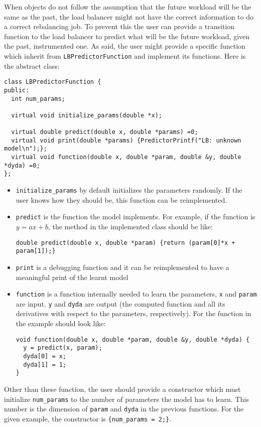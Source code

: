 When objects do not follow the assumption that the future workload will be the
same as the past, the load balancer might not have the correct information to do
a correct rebalancing job. To prevent this the user can provide a transition
function to the load balancer to predict what will be the future workload, given
the past, instrumented one. As said, the user might provide a specific function
which inherit from {\tt LBPredictorFunction} and implement its
functions. Here is the abstract class:
\begin{verbatim}
class LBPredictorFunction {
public:
  int num_params;
 
  virtual void initialize_params(double *x);

  virtual double predict(double x, double *params) =0;
  virtual void print(double *params) {PredictorPrintf("LB: unknown model\n");};
  virtual void function(double x, double *param, double &y, double *dyda) =0;
};
\end{verbatim}
\begin{itemize}
\item {\tt initialize\_params} by default initializes the parameters randomly. If the user
knows how they should be, this function can be reimplemented.
\item {\tt predict} is the function the model implements. For example, if the function is
$y=ax+b$, the method in the implemented class should be like:
\begin{verbatim}
double predict(double x, double *param) {return (param[0]*x + param[1]);}
\end{verbatim}
\item {\tt print} is a debugging function and it can be reimplemented to have a meaningful
print of the learnt model
\item {\tt function} is a function internally needed to learn the parameters, {\tt x} and
{\tt param} are input, {\tt y} and {\tt dyda} are output (the computed function and
all its derivatives with respect to the parameters, respectively).
For the function in the example should look like:
\begin{verbatim}
void function(double x, double *param, double &y, double *dyda) {
  y = predict(x, param);
  dyda[0] = x;
  dyda[1] = 1;
}
\end{verbatim}
\end{itemize}
Other than these function, the user should provide a constructor which must initialize
{\tt num\_params} to the number of parameters the model has to learn. This number is
the dimension of {\tt param} and {\tt dyda} in the previous functions. For the given
example, the constructor is {\tt \{num\_params = 2;\}}.

